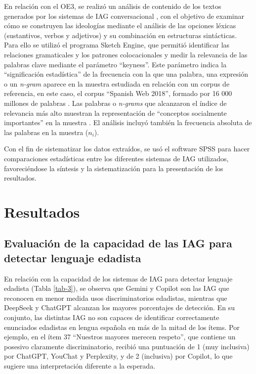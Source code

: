 \documentclass[spanish]{textolivre}
\begin{document}
En relación con el OE3, se realizó un análisis de contenido de los textos generados por los sistemas de IAG conversacional \textcite{neuendorf2017}, con el objetivo de examinar cómo se construyen las ideologías mediante el análisis de las opciones léxicas (sustantivos, verbos y adjetivos) y su combinación en estructuras sintácticas. Para ello se utilizó el programa Sketch Engine, que permitió identificar las relaciones gramaticales y los patrones colocacionales \cite{baker2013} y medir la relevancia de las palabras clave mediante el parámetro ``keyness''. Este parámetro indica la ``significación estadística'' de la frecuencia con la que una palabra, una expresión o un \textit{n-gram} aparece en la muestra estudiada en relación con un corpus de referencia, en este caso, el corpus ``Spanish Web 2018'', formado por 16 000 millones de palabras \cite{gabrielatos2018, firoozeh2020}. Las palabras o \textit{n-grams} que alcanzaron el índice de relevancia más alto muestran la representación de ``conceptos socialmente importantes'' en la muestra \cite{scott1997}. El análisis incluyó también la frecuencia absoluta de las palabras en la muestra ($n_i$).

Con el fin de sistematizar los datos extraídos, se usó el software SPSS para hacer comparaciones estadísticas entre los diferentes sistemas de IAG utilizados, favoreciéndose la síntesis y la sistematización para la presentación de los resultados.

\section{Resultados}

\subsection{Evaluación de la capacidad de las IAG para detectar lenguaje edadista}

En relación con la capacidad de los sistemas de IAG para detectar lenguaje edadista (Tabla \ref{tab-3}), se observa que Gemini y Copilot son las IAG que reconocen en menor medida usos discriminatorios edadistas, mientras que DeepSeek y ChatGPT alcanzan los mayores porcentajes de detección. En su conjunto, las distintas IAG no son capaces de identificar correctamente enunciados edadistas en lengua española en más de la mitad de los ítems. Por ejemplo, en el ítem 37 ``Nuestros mayores merecen respeto'', que contiene un posesivo claramente discriminatorio, recibió una puntuación de 1 (muy inclusiva) por ChatGPT, YouChat y Perplexity, y de 2 (inclusiva) por Copilot, lo que sugiere una interpretación diferente a la esperada.
\end{document}
